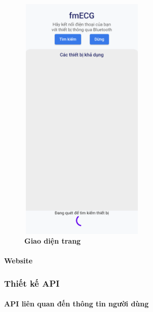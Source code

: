 \begin{figure}[H]
  \centering
  \includegraphics[width=6cm,height=12cm]{Images/mobile_app/demo/finding_bluetooth.png}
  \caption[Giao diện trang]{\bfseries \fontsize{12pt}{0pt}\selectfont Giao diện trang}
  \label{demo_} %
\end{figure}



\paragraph{Website}
\mbox{}

\subsubsection{Thiết kế API}

\paragraph{API liên quan đến thông tin người dùng}
\mbox{}

